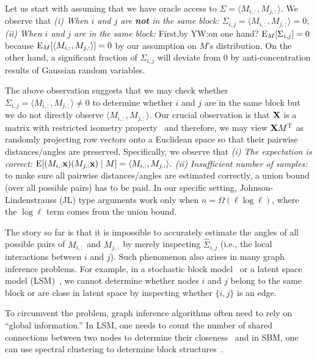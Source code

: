Let us start with assuming that we have oracle access to $\Sigma = \langle M_{i, :}, M_{j, :}\rangle$. We observe that 
\emph{(i) When $i$ and $j$ are \textbf{not} in the same block:} $\Sigma_{i,j} = \langle M_{i,:}, M_{j, :}\rangle = 0$; \emph{(ii) When $i$ and $j$ are in the same block:} First,{\color{red}by YW:on one hand?} 
    $\mathrm{E}_M[\Sigma_{i,j}] = 0$ because $\mathrm{E}_M[\langle M_{i, :}, M_{j, :}\rangle] = 0$ by our assumption on $M$'s distribution. On the other hand, a significant
    fraction of $\Sigma_{i,j}$ will deviate from $0$ by anti-concentration results of Gaussian random variables. 


 The above observation suggests that we may check whether $\Sigma_{i,j} = \langle M_{i, :}, M_{j, :} \rangle \neq 0$ to determine whether $i$ and $j$ are in the same block but we do not directly observe $\langle M_{i, :}, M_{j, :} \rangle$. Our crucial observation is that $\mathbf{X}$ is a matrix with restricted isometry property~\cite{candes2008restricted} and therefore, we may view $\mathbf{X} M^{\mathrm{T}}$ as randomly projecting row vectors onto a Euclidean space so that their pairwise distances/angles are preserved. Specifically, we observe that \emph{(i) The expectation is correct:} $\mathrm{E}[( M_{i, :} \mathbf{x})( M_{j, :} \mathbf{x} ) \mid M] = \langle M_{i, :}, M_{j, :} \rangle.$ \emph{(ii) Insufficient number of samples:} to make sure all pairwise distances/angles are estimated correctly, a union bound (over all possible pairs) has to be paid. In our specific setting, Johnson-Lindenstrauss (JL) type arguments work only when $n = \Omega (\ell \log \ell)$, where the $\log \ell$ term comes from the union bound. 
    


 The story so far is that it is impossible to accurately estimate the angles of all possible pairs of $M_{i, :}$ and $M_{j, :}$ by merely inspecting $\hat \Sigma_{i,j}$ (i.e., the local interactions between $i$ and $j$). Such phenomenon also arises in many graph inference problems.  
For example, in a stochastic block model~\cite{abbe2017community} or a latent space model (LSM)~\cite{abraham2015low,li2017world}, we cannot determine whether nodes $i$ and $j$ belong to the same block or are close in latent space by inspecting whether $\{i, j\}$ is an edge. 

To circumvent the problem, graph inference algorithms often need to rely on ``global information.'' In LSM, one needs to count the number of shared connections between two nodes to determine their closeness~\cite{abraham2015low} and in SBM, one can use spectral clustering to determine block structures~\cite{rohe2011spectral}. 

